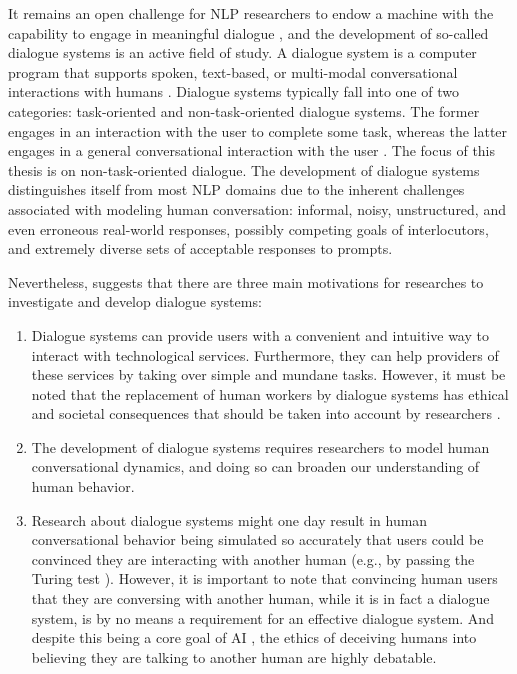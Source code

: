 

It remains an open challenge for NLP researchers to endow a machine with the capability to engage in meaningful dialogue \citep{burtsev-etal-2018-deeppavlov}, and the development of so-called dialogue systems is an active field of study.
A dialogue system is a computer program that supports spoken, text-based, or multi-modal conversational interactions with humans \citep{mctear2020conversational}.
Dialogue systems typically fall into one of two categories: task-oriented and non-task-oriented dialogue systems. The former engages in an interaction with the user to complete some task, whereas the latter engages in a general conversational interaction with the user \citep{Kushneryk2019IntelligentDS}. The focus of this thesis is on non-task-oriented dialogue.
The development of dialogue systems distinguishes itself from most NLP domains due to the inherent challenges associated with modeling human conversation: informal, noisy, unstructured, and even erroneous real-world responses, possibly competing goals of interlocutors, and extremely diverse sets of acceptable responses to prompts.

Nevertheless, \cite{mctear2020conversational} suggests that there are three main motivations for researches to investigate and develop dialogue systems:

\begin{enumerate}
    \item Dialogue systems can provide users with a convenient and intuitive way to interact with technological services. Furthermore, they can help providers of these services by taking over simple and mundane tasks. However, it must be noted that the replacement of human workers by dialogue systems has ethical and societal consequences that should be taken into account by researchers \citep{ivanov2020impact}. 
    \item The development of dialogue systems requires researchers to model human conversational dynamics, and doing so can broaden our understanding of human behavior.
    \item Research about dialogue systems might one day result in human conversational behavior being simulated so accurately that users could be convinced they are interacting with another human (e.g., by passing the Turing test \citep{oppy2003turing}). However, it is important to note that convincing human users that they are conversing with another human, while it is in fact a dialogue system, is by no means a requirement for an effective dialogue system. And despite this being a core goal of AI \citep{zheng2019personalized}, the ethics of deceiving humans into believing they are talking to another human are highly debatable.
\end{enumerate}


